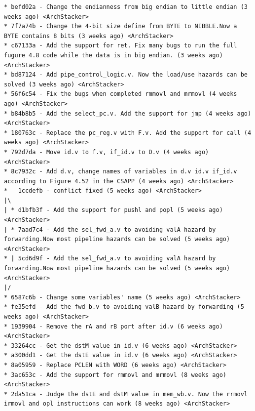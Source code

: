 \documentclass[12pt]{article}
\begin{document}
\begin{CJK*}{GB}{gbsn}
\begin{verbatim}
* befd02a - Change the endianness from big endian to little endian (3 weeks ago) <ArchStacker>                                                                          
* 7f7a74b - Change the 4-bit size define from BYTE to NIBBLE.Now a BYTE contains 8 bits (3 weeks ago) <ArchStacker>                                                     
* c67133a - Add the support for ret. Fix many bugs to run the full fugure 4.8 code while the data is in big endian. (3 weeks ago) <ArchStacker>                         
* bd87124 - Add pipe_control_logic.v. Now the load/use hazards can be solved (3 weeks ago) <ArchStacker>                                                                
* 56f6c54 - Fix the bugs when completed rmmovl and mrmovl (4 weeks ago) <ArchStacker>                                                                                   
* b84b8b5 - Add the select_pc.v. Add the support for jmp (4 weeks ago) <ArchStacker>                                                                                    
* 180763c - Replace the pc_reg.v with F.v. Add the support for call (4 weeks ago) <ArchStacker>                                                                         
* 792d7da - Move id.v to f.v, if_id.v to D.v (4 weeks ago) <ArchStacker>                                                                                                
* 8c7932c - Add d.v, change names of variables in d.v id.v if_id.v according to Figure 4.52 in the CSAPP (4 weeks ago) <ArchStacker>                                    
*   1ccdefb - conflict fixed (5 weeks ago) <ArchStacker>                                                                                                                
|\  
| * d1bfb3f - Add the support for pushl and popl (5 weeks ago) <ArchStacker>
| * 7aad7c4 - Add the sel_fwd_a.v to avoiding valA hazard by forwarding.Now most pipeline hazards can be solved (5 weeks ago) <ArchStacker>
* | 5cd6d9f - Add the sel_fwd_a.v to avoiding valA hazard by forwarding.Now most pipeline hazards can be solved (5 weeks ago) <ArchStacker>
|/  
* 6587c6b - Change some variables' name (5 weeks ago) <ArchStacker>
* fe35efd - Add the fwd_b.v to avoiding valB hazard by forwarding (5 weeks ago) <ArchStacker>
* 1939904 - Remove the rA and rB port after id.v (6 weeks ago) <ArchStacker>
* 33264cc - Get the dstM value in id.v (6 weeks ago) <ArchStacker>
* a300dd1 - Get the dstE value in id.v (6 weeks ago) <ArchStacker>
* 8a05959 - Replace PCLEN with WORD (6 weeks ago) <ArchStacker>
* 3ac653c - Add the support for rmmovl and mrmovl (8 weeks ago) <ArchStacker>
* 2da51ca - Judge the dstE and dstM value in mem_wb.v. Now the rrmovl irmovl and opl instructions can work (8 weeks ago) <ArchStacker>

\end{verbatim}
\end{CJK*}
\end{document}
